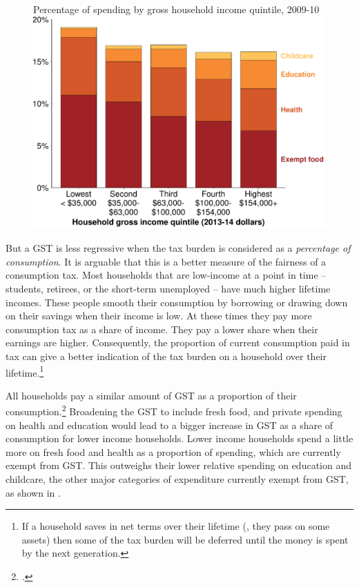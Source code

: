\begin{figure}[tb]
%
{Percentage of spending by gross household income quintile, 2009-10}
\includegraphics[width=\columnwidth]{atlas/figure/GST-Figure-4-1-tikzd.pdf}
\end{figure}

But a GST is less regressive when the tax burden is considered as a \emph{percentage of consumption}. It is arguable that this is a better measure of the fairness of a consumption tax. Most households that are low-income at a point in time – students, retirees, or the short-term unemployed – have much higher lifetime incomes. These people smooth their consumption by borrowing or drawing down on their savings when their income is low. At these times they pay more consumption tax as a share of income. They pay a lower share when their earnings are higher. Consequently, the proportion of current consumption paid in tax can give a better indication of the tax burden on a household over their lifetime.\footnote{\textcites[][275]{HenryTaxReview2010}[][34--36]{OECDKoreaInstitutePublicFinance2014-Distributional-Effects-Consumption-Taxes} If a household saves in net terms over their lifetime (\ie, they pass on some assets) then some of the tax burden will be deferred until the money is spent by the next generation.}

All households pay a similar amount of GST as a proportion of their consumption.\footcite[][41]{OECDKoreaInstitutePublicFinance2014-Distributional-Effects-Consumption-Taxes} Broadening the GST to include fresh food, and private spending on health and education would lead to a bigger increase in GST as a share of consumption for lower income households. Lower income households spend a little more on fresh food and health as a proportion of spending, which are currently exempt from GST. This outweighs their lower relative spending on education and childcare, the other major categories of expenditure currently exempt from GST, as shown in .


